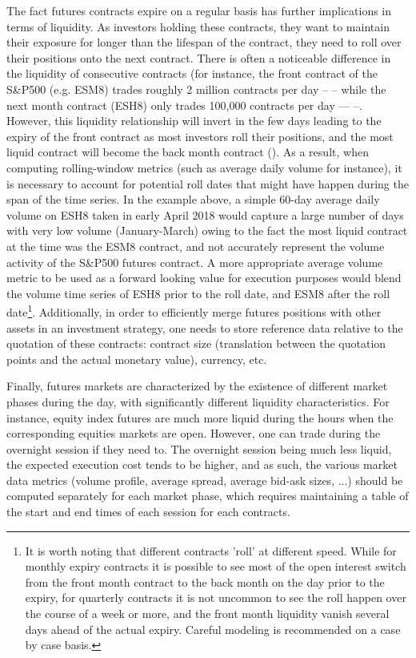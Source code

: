\begin{itemize}
The fact futures contracts expire on a regular basis has further implications in terms of liquidity. As investors holding these contracts, they want to maintain their exposure for longer than the lifespan of the contract, they need to roll over their positions onto the next contract. There is often a noticeable difference in the liquidity of consecutive contracts (for instance, the front contract of the S\&P500 (e.g. ESM8) trades roughly 2 million contracts per day --  -- while the next month contract (ESH8) only trades 100,000 contracts per day ---  --. However, this liquidity relationship will invert in the few days leading to the expiry of the front contract as most investors roll their positions, and the most liquid contract will become the back month contract (). As a result, when computing rolling-window metrics (such as average daily volume for instance), it is necessary to account for potential roll dates that might have happen during the span of the time series. In the example above, a simple 60-day average daily volume on ESH8 taken in early April 2018 would capture a large number of days with very low volume (January-March) owing to the fact the most liquid contract at the time was the ESM8 contract, and not accurately represent the volume activity of the S\&P500 futures contract. A more appropriate average volume metric to be used as a forward looking value for execution purposes would blend the volume time series of ESH8 prior to the roll date, and ESM8 after the roll date\footnote{It is worth noting that different contracts 'roll' at different speed. While for monthly expiry contracts it is possible to see most of the open interest switch from the front month contract to the back month on the day prior to the expiry, for quarterly contracts it is not uncommon to see the roll happen over the course of a week or more, and the front month liquidity vanish several days ahead of the actual expiry. Careful modeling is recommended on a case by case basis.}. Additionally, in order to efficiently merge futures positions with other assets in an investment strategy, one needs to store reference data relative to the quotation of these contracts: contract size (translation between the quotation points and the actual monetary value), currency, etc. 

Finally, futures markets are characterized by the existence of different market phases during the day, with significantly different liquidity characteristics. For instance, equity index futures are much more liquid during the hours when the corresponding equities markets are open. However, one can trade during the overnight session if they need to. The overnight session being much less liquid, the expected execution cost tends to be higher, and as such, the various market data metrics (volume profile, average spread, average bid-ask sizes, ...) should be computed separately for each market phase, which requires maintaining a table of the start and end times of each session for each contracts. 



\end{itemize}
